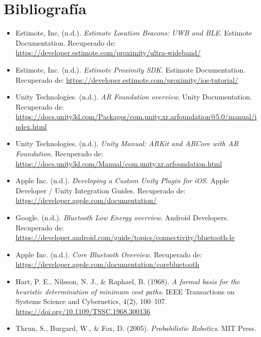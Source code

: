 \documentclass{article}
\begin{document}
    
 

\section{Bibliografía}
\begin{itemize} 
    \item Estimote, Inc. (n.d.). \textit{Estimote Location Beacons: UWB and BLE}. Estimote Documentation. Recuperado de: \url{https://developer.estimote.com/proximity/ultra-wideband/}
    
    \item Estimote, Inc. (n.d.). \textit{Estimote Proximity SDK}. Estimote Documentation. Recuperado de: \url{https://developer.estimote.com/proximity/ios-tutorial/}
    
    \item Unity Technologies. (n.d.). \textit{AR Foundation overview}. Unity Documentation. Recuperado de: \url{https://docs.unity3d.com/Packages/com.unity.xr.arfoundation@5.0/manual/index.html}
    
    \item Unity Technologies. (n.d.). \textit{Unity Manual: ARKit and ARCore with AR Foundation}. Recuperado de: \url{https://docs.unity3d.com/Manual/com.unity.xr.arfoundation.html}

    \item Apple Inc. (n.d.). \textit{Developing a Custom Unity Plugin for iOS}. Apple Developer / Unity Integration Guides. Recuperado de: \url{https://developer.apple.com/documentation/}
    
    \item Google. (n.d.). \textit{Bluetooth Low Energy overview}. Android Developers. Recuperado de: \url{https://developer.android.com/guide/topics/connectivity/bluetooth-le}
    
    \item Apple Inc. (n.d.). \textit{Core Bluetooth Overview}. Recuperado de: \url{https://developer.apple.com/documentation/corebluetooth}
    
    \item Hart, P. E., Nilsson, N. J., \& Raphael, B. (1968). \textit{A formal basis for the heuristic determination of minimum cost paths}. IEEE Transactions on Systems Science and Cybernetics, 4(2), 100–107. \url{https://doi.org/10.1109/TSSC.1968.300136}
    
    \item Thrun, S., Burgard, W., \& Fox, D. (2005). \textit{Probabilistic Robotics}. MIT Press.
    

\end{itemize}
\end{document}
